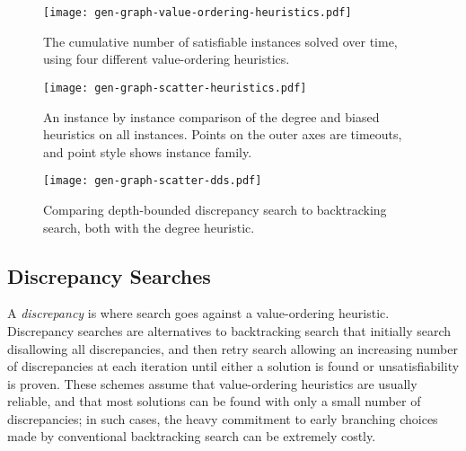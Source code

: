 \documentclass[letterpaper]{article} %
\begin{document}
\begin{figure}[p]
    \centering
    \texttt{[image: gen-graph-value-ordering-heuristics.pdf]}

    \caption{The cumulative number of satisfiable instances solved over time, using four
    different value-ordering heuristics.}
    \label{figure:value-ordering-heuristics}
\end{figure}

\begin{figure}[p]
    \centering
    \texttt{[image: gen-graph-scatter-heuristics.pdf]}

    \caption{An instance by instance comparison of the degree and biased heuristics on all
    instances. Points on the outer axes are timeouts, and point style shows instance family.}
    \label{figure:scatter-heuristics}
\end{figure}

\begin{figure}[p]
    \centering
    \texttt{[image: gen-graph-scatter-dds.pdf]}

    \caption{Comparing depth-bounded discrepancy search to backtracking search, both with the degree
    heuristic.}\label{figure:scatter-dds}
\end{figure}

\subsection{Discrepancy Searches}

A \emph{discrepancy} is where search goes against a value-ordering heuristic.  Discrepancy searches
\cite{DBLP:conf/ijcai/HarveyG95,DBLP:conf/aaai/Korf96,DBLP:conf/ijcai/Walsh97,DBLP:conf/cpaior/KarouiHLN07}
are alternatives to backtracking search that initially search disallowing all discrepancies, and
then retry search allowing an increasing number of discrepancies at each iteration until either a
solution is found or unsatisfiability is proven. These schemes assume that value-ordering heuristics
are usually reliable, and that most solutions can be found with only a small number of
discrepancies; in such cases, the heavy commitment to early branching choices made by conventional
backtracking search can be extremely costly.
\end{document}
